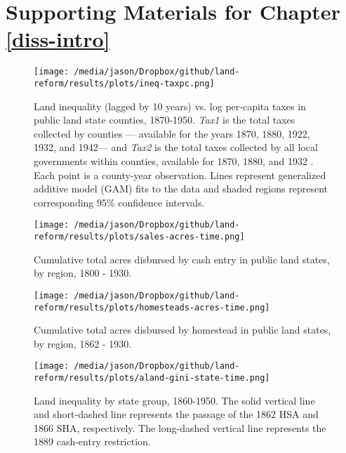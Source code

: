 \chapter{Supporting Materials for Chapter \ref{diss-intro}}

\begin{figure}[htbp]
	\begin{center}
		\texttt{[image: /media/jason/Dropbox/github/land-reform/results/plots/ineq-taxpc.png]} 
	\end{center}
	\caption{Land inequality (lagged by 10 years) vs. log per-capita taxes in public land state counties, 1870-1950. \emph{Tax1} is the total taxes collected by counties --- available for the years 1870, 1880, 1922, 1932, and 1942--- and \emph{Tax2} is the total taxes collected by all local governments within counties, available for 1870, 1880, and 1932 \citep{rhode2003assessing,haines2010}. Each point is a county-year observation. Lines represent generalized additive model (GAM) fits to the data and shaded regions represent corresponding 95\% confidence intervals.   \label{fig:ineq-taxpc}}
\end{figure} 

\begin{figure}[htbp]
	\begin{center}
		\texttt{[image: /media/jason/Dropbox/github/land-reform/results/plots/sales-acres-time.png]}
	\end{center}
	\caption{Cumulative total acres disbursed by cash entry in public land states, by region, 1800 - 1930. \label{sales-acres-time}} 
\end{figure}

\begin{figure}[htbp]
	\begin{center}
		\texttt{[image: /media/jason/Dropbox/github/land-reform/results/plots/homesteads-acres-time.png]}
	\end{center}
	\caption{Cumulative total acres disbursed by homestead in public land states, by region, 1862 - 1930. \label{homesteads-acres-time}} 
\end{figure}

\begin{figure}[htbp]
	\begin{center}
		\texttt{[image: /media/jason/Dropbox/github/land-reform/results/plots/aland-gini-state-time.png]}
	\end{center}
	\caption{Land inequality by state group, 1860-1950. The solid vertical line and short-dashed line represents the passage of the 1862 HSA and 1866 SHA, respectively. The long-dashed vertical line represents the 1889 cash-entry restriction. \label{aland-gini-state-time}} 
\end{figure}

